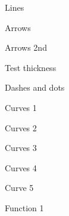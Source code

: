 \documentclass[10pt,english,twocolumn,fleqn]{extarticle}
\begin{document}
\begin{figure}
\centering

\par
\caption{Lines}
\end{figure}

\begin{figure}
\centering

\par
\caption{Arrows}
\end{figure}

\begin{figure}
\centering

\par
\caption{Arrows 2nd}
\end{figure}

\begin{figure}
\centering

\par
\caption{Test thickness}
\end{figure}

\begin{figure}
\centering

\par
\caption{Dashes and dots}
\end{figure}

\begin{figure}
\centering

\par
\caption{Curves 1}
\end{figure}

\begin{figure}
\centering

\par
\caption{Curves 2}
\end{figure}

\begin{figure}
\centering

\par
\caption{Curves 3}
\end{figure}

\begin{figure}
\centering

\par
\caption{Curves 4}
\end{figure}

\begin{figure}
\centering

\par
\caption{Curve 5}
\end{figure}

\begin{figure}
\centering

\par
\caption{Function 1}
\end{figure}
\end{document}

